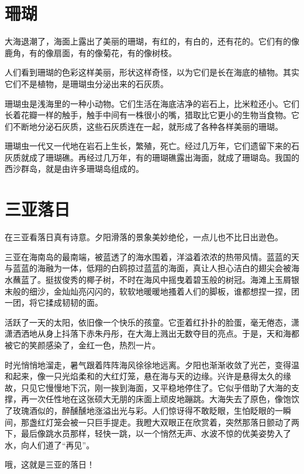 \documentclass[12pt,UTF-8,openany]{ctexbook}
\begin{document}
\chapter{珊瑚}

\begin{Large}
    
    大海退潮了，海面上露出了美丽的珊瑚，有红的，有白的，还有花的。它们有的像鹿角，有的像扇面，有的像菊花，有的像树枝。
    
    人们看到珊瑚的色彩这样美丽，形状这样奇怪，以为它们是长在海底的植物。其实它们不是植物，是珊瑚虫分泌出来的石灰质。
    
    珊瑚虫是浅海里的一种小动物。它们生活在海底洁净的岩石上，比米粒还小。它们长着花瓣一样的触手，触手中间有一株很小的嘴，猎取比它更小的生物当食物。它们不断地分泌石灰质，这些石灰质连在一起，就形成了各种各样美丽的珊瑚。
    
    珊瑚虫一代又一代地在岩石上生长，繁殖，死亡。经过几万年，它们遗留下来的石灰质就成了珊瑚礁。再经过几万年，有的珊瑚礁露出海面，就成了珊瑚岛。我国的西沙群岛，就是由许多珊瑚岛组成的。
    
\end{Large}

\chapter{三亚落日}

\begin{Large}
    
    在三亚看落日真有诗意。夕阳滑落的景象美妙绝伦，一点儿也不比日出逊色。
    
    三亚在海南岛的最南端，被蓝透了的海水围着，洋溢着浓浓的热带风情。蓝蓝的天与蓝蓝的海融为一体，低翔的白鸥掠过蓝蓝的海面，真让人担心洁白的翅尖会被海水蘸蓝了。挺拔俊秀的椰子树，不时在海风中摇曳着碧玉般的树冠。海滩上玉屑银末般的细沙，金灿灿亮闪闪的，软软地暖暖地搔着人们的脚板，谁都想捏一捏，团一团，将它揉成韧韧的面。
    
    活跃了一天的太阳，依旧像一个快乐的孩童。它歪着红扑扑的脸蛋，毫无倦态，潇潇洒洒地从身上抖落下赤朱丹彤，在大海上溅出无数夺目的亮点。于是，天和海都被它的笑颜感染了，金红一色，热烈一片。
    
    时光悄悄地溜走，暑气跟着阵阵海风徐徐地远离。夕阳也渐渐收敛了光芒，变得温和起来，像一只光焰柔和的大红灯笼，悬在海与天的边缘。兴许是悬得太久的缘故，只见它慢慢地下沉，刚一挨到海面，又平稳地停住了。它似乎借助了大海的支撑，再一次任性地在这张硕大无朋的床面上顽皮地蹦跳。大海失去了原色，像饱饮了玫瑰酒似的，醉醺醺地涨溢出光与彩。人们惊讶得不敢眨眼，生怕眨眼的一瞬间，那盏红灯笼会被一只巨手提走。我瞪大双眼正在欣赏着，突然那落日颤动了两下，最后像跳水员那样，轻快一跳，以一个悄然无声、水波不惊的优美姿势入了水，向人们道了“再见”。
    
    哦，这就是三亚的落日！
    
\end{Large}
\end{document}
